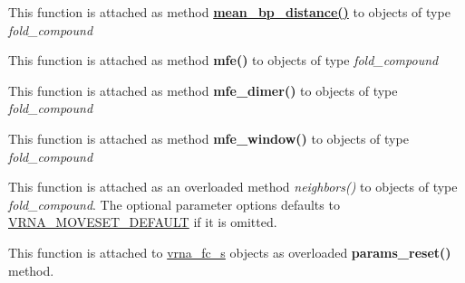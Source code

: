 \begin{DoxyRefList}
\item[\label{wrappers__wrappers000085}%
\Hypertarget{wrappers__wrappers000085}%
Global \mbox{\hyperlink{group__pf__fold_gaa6b8983b559b9ef4b2e1b31113ea317b}{vrna\+\_\+mean\+\_\+bp\+\_\+distance}} (vrna\+\_\+fold\+\_\+compound\+\_\+t $\ast$vc)]This function is attached as method {\bfseries \mbox{\hyperlink{group__pf__fold_ga79cbc375af65f11609feb6b055269e7d}{mean\+\_\+bp\+\_\+distance()}}} to objects of type {\itshape fold\+\_\+compound}  
\item[\label{wrappers__wrappers000074}%
\Hypertarget{wrappers__wrappers000074}%
Global \mbox{\hyperlink{group__mfe__fold_gabd3b147371ccf25c577f88bbbaf159fd}{vrna\+\_\+mfe}} (vrna\+\_\+fold\+\_\+compound\+\_\+t $\ast$vc, char $\ast$structure)]This function is attached as method {\bfseries mfe()} to objects of type {\itshape fold\+\_\+compound}  
\item[\label{wrappers__wrappers000075}%
\Hypertarget{wrappers__wrappers000075}%
Global \mbox{\hyperlink{group__mfe__cofold_gaab22d10c1190f205f16a77cab9d5d3ee}{vrna\+\_\+mfe\+\_\+dimer}} (vrna\+\_\+fold\+\_\+compound\+\_\+t $\ast$vc, char $\ast$structure)]This function is attached as method {\bfseries mfe\+\_\+dimer()} to objects of type {\itshape fold\+\_\+compound}  
\item[\label{wrappers__wrappers000076}%
\Hypertarget{wrappers__wrappers000076}%
Global \mbox{\hyperlink{group__local__mfe__fold_ga689df235a1915a1ad56e377383c044ce}{vrna\+\_\+mfe\+\_\+window}} (vrna\+\_\+fold\+\_\+compound\+\_\+t $\ast$vc, F\+I\+LE $\ast$file)]This function is attached as method {\bfseries mfe\+\_\+window()} to objects of type {\itshape fold\+\_\+compound}  
\item[\label{wrappers__wrappers000078}%
\Hypertarget{wrappers__wrappers000078}%
Global \mbox{\hyperlink{group__neighbors_gab1473d856b15da2120fe648977798ad5}{vrna\+\_\+neighbors}} (vrna\+\_\+fold\+\_\+compound\+\_\+t $\ast$vc, const short $\ast$pt, unsigned int options)]This function is attached as an overloaded method {\itshape neighbors()} to objects of type {\itshape fold\+\_\+compound}. The optional parameter {\ttfamily options} defaults to \mbox{\hyperlink{group__neighbors_gaa5ffec4dd0d02df320f123e6888154d1}{V\+R\+N\+A\+\_\+\+M\+O\+V\+E\+S\+E\+T\+\_\+\+D\+E\+F\+A\+U\+LT}} if it is omitted.  
\item[\label{wrappers__wrappers000081}%
\Hypertarget{wrappers__wrappers000081}%
Global \mbox{\hyperlink{group__energy__parameters_gac40dc82e48a72a97cfc58b9da08a7792}{vrna\+\_\+params\+\_\+reset}} (vrna\+\_\+fold\+\_\+compound\+\_\+t $\ast$vc, vrna\+\_\+md\+\_\+t $\ast$md\+\_\+p)]This function is attached to \mbox{\hyperlink{group__fold__compound_structvrna__fc__s}{vrna\+\_\+fc\+\_\+s}} objects as overloaded {\bfseries params\+\_\+reset()} method.


\end{DoxyRefList}
